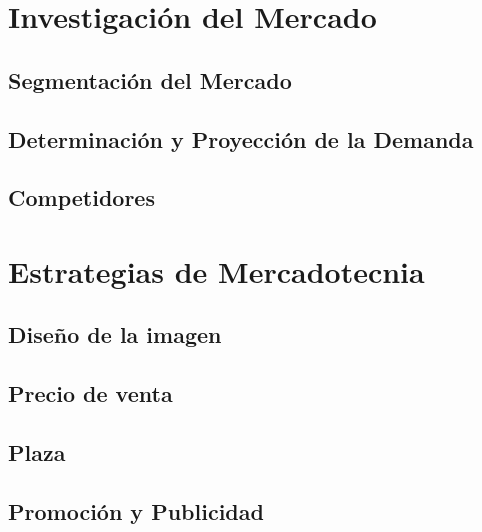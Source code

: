 
\section{Investigación del Mercado}

	\subsection{Segmentación del Mercado}
	
	\subsection{Determinación y Proyección de la Demanda}
	
	\subsection{Competidores}
	
\section{Estrategias de Mercadotecnia}

	\subsection{Diseño de la imagen}
	
	\subsection{Precio de venta}
	
	\subsection{Plaza}
	
	\subsection{Promoción y Publicidad}
